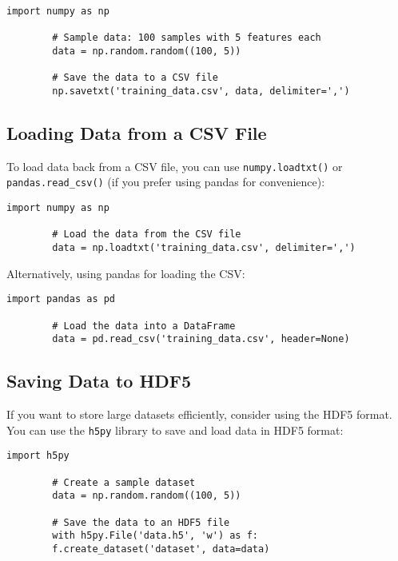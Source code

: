 	\begin{lstlisting}[caption={Saving Data to a CSV File}, label={code:save-csv}, style=pythonstyle]
		import numpy as np
		
		# Sample data: 100 samples with 5 features each
		data = np.random.random((100, 5))
		
		# Save the data to a CSV file
		np.savetxt('training_data.csv', data, delimiter=',')
	\end{lstlisting}
	
	\subsection{Loading Data from a CSV File}
	To load data back from a CSV file, you can use \texttt{numpy.loadtxt()} or \texttt{pandas.read\_csv()} (if you prefer using pandas for convenience):
	
	\begin{lstlisting}[caption={Loading Data from a CSV File}, label={code:load-csv}, style=pythonstyle]
		import numpy as np
		
		# Load the data from the CSV file
		data = np.loadtxt('training_data.csv', delimiter=',')
	\end{lstlisting}
	
	Alternatively, using pandas for loading the CSV:
	
	\begin{lstlisting}[caption={Loading Data with Pandas}, label={code:load-pandas}, style=pythonstyle]
		import pandas as pd
		
		# Load the data into a DataFrame
		data = pd.read_csv('training_data.csv', header=None)
	\end{lstlisting}
	
	\subsection{Saving Data to HDF5}
	If you want to store large datasets efficiently, consider using the HDF5 format. You can use the \texttt{h5py} library to save and load data in HDF5 format:
	
	\begin{lstlisting}[caption={Saving Data to HDF5}, label={code:save-hdf5}, style=pythonstyle]
		import h5py
		
		# Create a sample dataset
		data = np.random.random((100, 5))
		
		# Save the data to an HDF5 file
		with h5py.File('data.h5', 'w') as f:
		f.create_dataset('dataset', data=data)
	\end{lstlisting}
	
